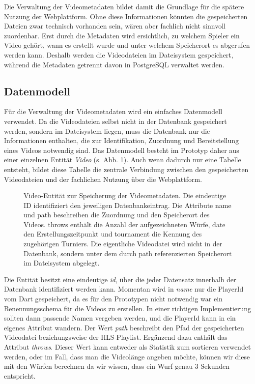 Die Verwaltung der Videometadaten bildet damit die Grundlage für die spätere Nutzung der Webplattform. Ohne diese Informationen könnten die gespeicherten Dateien zwar technisch vorhanden sein, wären aber fachlich nicht sinnvoll zuordenbar. Erst durch die Metadaten wird ersichtlich, 
zu welchem Spieler ein Video gehört, wann es erstellt wurde und unter welchem Speicherort es abgerufen werden kann. Deshalb werden die Videodateien im Dateisystem gespeichert, während die Metadaten getrennt davon in PostgreSQL verwaltet werden.

\subsection{Datenmodell} 

Für die Verwaltung der Videometadaten wird ein einfaches Datenmodell verwendet. Da die Videodateien selbst nicht in der Datenbank gespeichert werden, sondern im Dateisystem liegen, muss die Datenbank nur die Informationen enthalten, die zur Identifikation, 
Zuordnung und Bereitstellung eines Videos notwendig sind. Das Datenmodell besteht im Prototyp daher aus einer einzelnen Entität \textit{Video} (s. Abb. \ref{fig:video-entity}). Auch wenn dadurch nur eine Tabelle entsteht, 
bildet diese Tabelle die zentrale Verbindung zwischen den gespeicherten Videodateien und der fachlichen Nutzung über die Webplattform. 

\begin{figure}[H] 
    \centering 
     
    \caption[Video-Entität des Datenmodells]{Video-Entität zur Speicherung der Videometadaten. Die eindeutige ID identifiziert den jeweiligen Datenbankeintrag. Die Attribute name und path beschreiben die Zuordnung und den Speicherort des Videos. throws enthält die Anzahl der aufgezeichneten Würfe,
    date den Erstellungszeitpunkt und tournament die Kennung des zugehörigen Turniers. Die eigentliche Videodatei wird nicht in der Datenbank, sondern unter dem durch path referenzierten Speicherort im Dateisystem abgelegt.}
    \label{fig:video-entity} 
\end{figure} 

Die Entität besitzt eine eindeutige \textit{id}, über die jeder Datensatz innerhalb der Datenbank identifiziert werden kann. Momentan wird in \textit{name} nur die PlayerId vom Dart gespeichert, da es für den Prototypen nicht notwendig war ein Benennungsschema für die Videos zu erstellen. 
In einer richtigen Implementierung sollten dann passende Namen vergeben werden, und die PlayerId kann in ein eigenes Attribut wandern. Der Wert \textit{path} beschreibt den Pfad der gespeicherten Videodatei beziehungsweise der HLS-Playlist. Ergänzend dazu enthält das Attribut \textit{throws}.
Dieser Wert kann entweder als Statistik zum sortieren verwendet werden, oder im Fall, dass man die Videolänge angeben möchte, können wir diese mit den Würfen berechnen da wir wissen, dass ein Wurf genau 3 Sekunden entspricht. 

